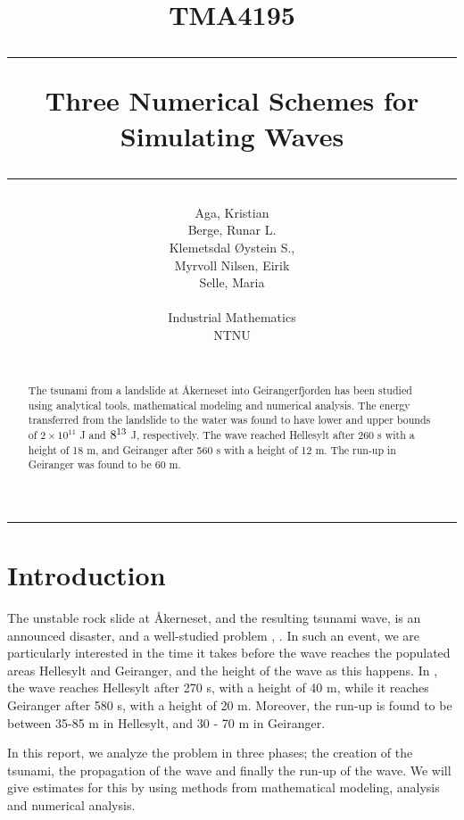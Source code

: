 \documentclass[11pt]{article}
\author{Aga, Kristian \\ Berge, Runar L. \\ Klemetsdal Øystein S.,\\
	Myrvoll Nilsen, Eirik \\ Selle, Maria\\\\
	Industrial Mathematics\\
	NTNU \\\\
}
\title{
TMA4195 \\ \vspace{5pt}
\hrule \vspace{10pt}
       {\Huge \textbf{Three Numerical Schemes for Simulating Waves}}
\vspace{10pt}\hrule\vspace{1cm}
}
\begin{document}
\maketitle
\vspace{1cm}
\hrule
\vspace{0.5cm}
\begin{abstract}
%	
	The tsunami from a landslide at Åkerneset into Geirangerfjorden has been studied using analytical tools, mathematical modeling and
	numerical analysis. The energy transferred from the landslide to the water was found to have lower and upper bounds of $2\times 10^{11}$ J and $8 \time 10^{13}$ J,
	respectively. The wave reached Hellesylt after 260 s with a height of 18 m, and Geiranger after 560 s with a height of 12 m. The run-up in Geiranger was found to
	be 60 m.
\end{abstract}
\thispagestyle{empty}
\clearpage
\tableofcontents
\thispagestyle{empty}
\clearpage
\setcounter{page}{1}
%
%
\section{Introduction}
The unstable rock slide at Åkerneset, and the resulting tsunami wave, is an announced disaster, and a well-studied problem \citep{harbitz14}, \citep{lothe10}. In such an event, we are particularly interested in the time it
takes before the wave reaches the populated areas Hellesylt and Geiranger, and the height of the wave as this happens. In \cite{harbitz14}, the wave reaches Hellesylt after 270 s,
with a height of 40 m, while it reaches Geiranger after 580 s, with a height of 20 m. Moreover, the run-up is found to be between 35-85 m in Hellesylt, and 30 - 70 m in Geiranger.

In this report, we analyze the problem in three phases; the creation of the tsunami, the propagation of the wave and finally the run-up of the wave.
We will give estimates for this by using methods from mathematical modeling, analysis and numerical analysis.
\end{document}
